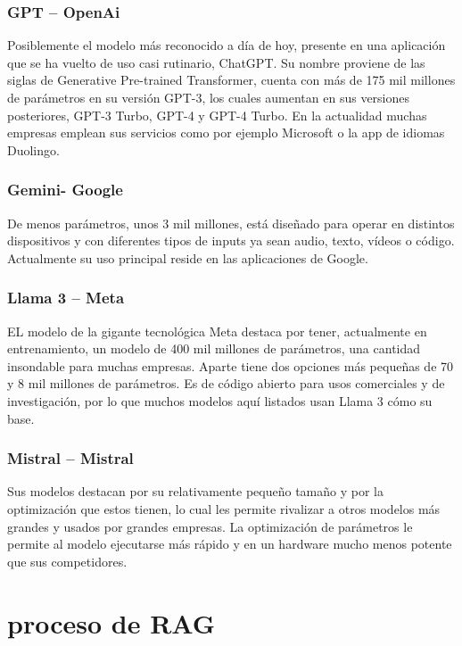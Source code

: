 \subsubsection{GPT – OpenAi}

Posiblemente el modelo más reconocido a día de hoy, presente en una aplicación que se ha vuelto de uso casi rutinario, ChatGPT. Su nombre proviene de las siglas de Generative Pre-trained Transformer, cuenta con más de 175 mil millones de parámetros en su versión GPT-3, los cuales aumentan en sus versiones posteriores, GPT-3 Turbo, GPT-4 y GPT-4 Turbo. En la actualidad muchas empresas emplean sus servicios como por ejemplo Microsoft o la app de idiomas Duolingo.

\subsubsection{Gemini- Google}

 De menos parámetros, unos 3 mil millones, está diseñado para operar en distintos dispositivos y con diferentes tipos de inputs ya sean audio, texto, vídeos o código. Actualmente su uso principal reside en las aplicaciones de Google.
 
\subsubsection{Llama 3 – Meta}

EL modelo de la gigante tecnológica Meta destaca por tener, actualmente en entrenamiento, un modelo de 400 mil millones de parámetros, una cantidad insondable para muchas empresas. Aparte tiene dos opciones más pequeñas de 70 y 8 mil millones de parámetros. Es de código abierto para usos comerciales y de investigación, por lo que muchos modelos aquí listados usan Llama 3 cómo su base.

\subsubsection{Mistral – Mistral}

Sus modelos destacan por su relativamente pequeño tamaño y por la optimización que estos tienen, lo cual les permite rivalizar a otros modelos más grandes y usados por grandes empresas. La optimización de parámetros le permite al modelo ejecutarse más rápido y en un hardware mucho menos potente que sus competidores.


\section{proceso de RAG}
